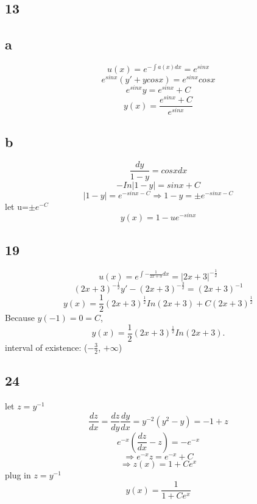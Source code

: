 \documentclass[12pt, a4paper]{IEEEtran}
\begin{document}
    \subsection*{13}
    \subsection*{a}
    $$u(x)=e^{-\int a(x)dx}=e^{sinx}$$
    $$e^{sinx}(y'+ycosx)=e^{sinx}cosx$$
    $$e^{sinx}y=e^{sinx}+C$$
    $$y(x)=\frac{e^{sinx}+C}{e^{sinx}}$$

    \subsection*{b}
    $$\frac{dy}{1-y}=cosx dx$$
    $$-In|1-y|=sinx+C$$
    $$|1-y|=e^{-sinx-C}\Rightarrow 1-y=\pm e^{-sinx-C}$$
    let u=$\pm e^{-C}$
    $$y(x)=1-ue^{-sinx}$$


    \subsection*{19}
    $$u(x)=e^{\int -\frac{1}{2x+3}dx}=|2x+3|^{-\frac{1}{2}}$$
    $$(2x+3)^{-\frac{1}{2}}y'-(2x+3)^{-\frac{3}{2}}=(2x+3)^{-1}$$
    $$y(x)=\frac{1}{2}(2x+3)^{\frac{1}{2}}In(2x+3)+C(2x+3)^{\frac{1}{2}}$$
    Because $y(-1)=0=C$,
    $$y(x)=\frac{1}{2}(2x+3)^{\frac{1}{2}}In(2x+3).$$
    interval of existence:
    ($-\frac{3}{2}$, $+\infty$)
    
    
    \vspace{6cm}
    \subsection*{24}
    let $z=y^{-1}$
    $$\frac{dz}{dx}=\frac{dz}{dy}\frac{dy}{dx}=y^{-2}(y^2-y)=-1+z$$
    $$e^{-x}(\frac{dz}{dx}-z)=-e^{-x}$$
    $$\Rightarrow e^{-x}z=e^{-x}+C$$
    $$\Rightarrow z(x)=1+Ce^{x}$$
plug in $z=y^{-1}$
$$y(x)=\frac{1}{1+Ce^x}$$

    
\end{document}
